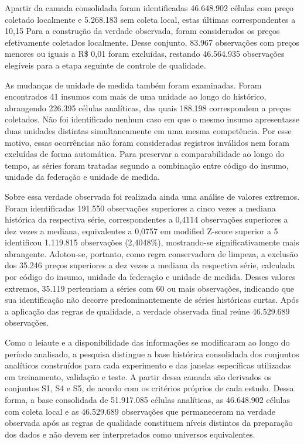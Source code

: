 Apartir da camada consolidada foram identificadas 46.648.902 células com preço coletado 
localmente e 5.268.183 sem coleta local, estas últimas correspondentes a 10,15%
Para a construção da verdade observada, foram considerados os preços efetivamente coletados localmente. 
Desse conjunto, 83.967 observações com preços menores ou iguais a R\$ 0,01 foram excluídas, restando 
46.564.935 observações elegíveis para a etapa seguinte de controle de qualidade.

As mudanças de unidade de medida também foram examinadas. Foram encontrados 41 insumos 
com mais de uma unidade ao longo do histórico, abrangendo 226.395 células analíticas, 
das quais 188.198 correspondem a preços coletados. Não foi identificado nenhum caso em 
que o mesmo insumo apresentasse duas unidades distintas simultaneamente em uma mesma 
competência. Por esse motivo, essas ocorrências não foram consideradas registros 
inválidos nem foram excluídas de forma automática. Para preservar a comparabilidade ao 
longo do tempo, as séries foram tratadas segundo a combinação entre código do insumo, 
unidade da federação e unidade de medida.

Sobre essa verdade observada foi realizada ainda uma análise de valores extremos. Foram 
identificadas 191.550 observações superiores a cinco vezes a mediana histórica da 
respectiva série, correspondentes a 0,4114%
observações superiores a dez vezes a mediana, equivalentes a 0,0757%
em modified Z-score superior a 5 identificou 1.119.815 observações (2,4048\%), 
mostrando-se significativamente mais abrangente. Adotou-se, portanto, como regra 
conservadora de limpeza, a exclusão dos 35.246 preços superiores a dez vezes a mediana 
da respectiva série, calculada por código do insumo, unidade da federação e unidade de 
medida. Desses valores extremos, 35.119 pertenciam a séries com 60 ou mais observações, 
indicando que sua identificação não decorre predominantemente de séries históricas curtas. 
Após a aplicação das regras de qualidade, a verdade observada final reúne 46.529.689 
observações.

Como o leiaute e a disponibilidade das informações se modificaram ao longo do período 
analisado, a pesquisa distingue a base histórica consolidada dos conjuntos analíticos 
construídos para cada experimento e das janelas específicas utilizadas em treinamento, 
validação e teste. A partir dessa camada são derivados os conjuntos S1, S4 e S5, de 
acordo com os critérios próprios de cada estudo. Dessa forma, a base consolidada de 
51.917.085 células analíticas, as 46.648.902 células com coleta local e as 46.529.689 
observações que permaneceram na verdade observada após as regras de qualidade constituem 
níveis distintos da preparação dos dados e não devem ser interpretados como universos 
equivalentes.

